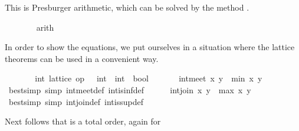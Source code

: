 \begin{isabellebody}
\begin{isamarkuptxt}
\begin{isabelle}
\end{isabelle}
	This is Presburger arithmetic, which can be solved by the
        method .%
\end{isamarkuptxt}%
\isamarkuptrue%
\ \ \ \ \ \ \isamarkupfalse%
\ arith{}%
\begin{isamarkuptxt}%
\normalsize In order to show the equations, we put ourselves
      in a situation where the lattice theorems can be used in a
      convenient way.%
\end{isamarkuptxt}%
\isamarkuptrue%
\ \ \ \ \isamarkupfalse%
\ \isamarkupfalse%
\ int{}\ lattice\ {}op\ {}\ {}{}\ int\ {}\ int\ {}\ bool{}\ \isamarkupfalse%
\isanewline
\ \ \ \ \isamarkupfalse%
\ {}int{}meet\ x\ y\ {}\ min\ x\ y{}\isanewline
\ \ \ \ \ \ \isamarkupfalse%
\ {}bestsimp\ simp{}\ int{}meet{}def\ int{}is{}inf{}def{}\isanewline
\ \ \ \ \isamarkupfalse%
\ {}int{}join\ x\ y\ {}\ max\ x\ y{}\isanewline
\ \ \ \ \ \ \isamarkupfalse%
\ {}bestsimp\ simp{}\ int{}join{}def\ int{}is{}sup{}def{}\isanewline
\ \ \isamarkupfalse%
%
\endisatagvisible
{\isafoldvisible}%
%
\isadelimvisible
%
\endisadelimvisible
%
\begin{isamarkuptext}%
Next follows that  is a total order, again for

\end{isamarkuptext}
\end{isabellebody}
